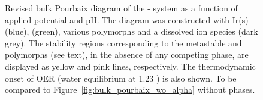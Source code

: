 \begin{figure}[!htb]
\centering
{}
\caption{\label{fig:bulk_pourbaix}
%
Revised bulk Pourbaix diagram of the - system as a function of applied potential and pH.
%
The diagram was constructed with Ir(s) (blue), \rIrOtwo (green), various \IrOthree polymorphs and a dissolved  ion species (dark grey).
%
The stability regions corresponding to the metastable \rIrOthree and \bIrOthree polymorphs (see text), in the absence of any competing \IrOthree phase, are displayed as yellow and pink lines, respectively.
%
The thermodynamic onset of OER (water equilibrium at \num{1.23} \VRHE) is also shown. To be compared to Figure~\ref{fig:bulk_pourbaix_wo_alpha} without \IrOthree phases. 
%
%
}
\end{figure}


